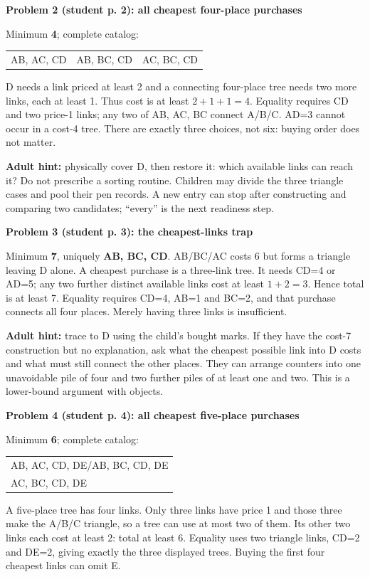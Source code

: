 \documentclass[11pt,letterpaper]{article}
\newcommand\task[2]{\par\vspace{3pt}\textbf{Problem #1 (student p. #1): #2}\par}
\begin{document}
\task{2}{all cheapest four-place purchases}
Minimum \textbf{4}; complete catalog:
\begin{center}
\begin{tabular}{lll}
AB, AC, CD & AB, BC, CD & AC, BC, CD
\end{tabular}
\end{center}
D needs a link priced at least 2 and a connecting four-place tree needs two more links, each at least 1. Thus cost is at least $2+1+1=4$. Equality requires CD and two price-1 links; any two of AB, AC, BC connect A/B/C. AD=3 cannot occur in a cost-4 tree. There are exactly three choices, not six: buying order does not matter.

\textbf{Adult hint:} physically cover D, then restore it: which available links can reach it? Do not prescribe a sorting routine. Children may divide the three triangle cases and pool their pen records. A new entry can stop after constructing and comparing two candidates; ``every'' is the next readiness step.

\task{3}{the cheapest-links trap}
Minimum \textbf{7}, uniquely \textbf{AB, BC, CD}. AB/BC/AC costs 6 but forms a triangle leaving D alone. A cheapest purchase is a three-link tree. It needs CD=4 or AD=5; any two further distinct available links cost at least $1+2=3$. Hence total is at least 7. Equality requires CD=4, AB=1 and BC=2, and that purchase connects all four places. Merely having three links is insufficient.

\textbf{Adult hint:} trace to D using the child's bought marks. If they have the cost-7 construction but no explanation, ask what the cheapest possible link into D costs and what must still connect the other places. They can arrange counters into one unavoidable pile of four and two further piles of at least one and two. This is a lower-bound argument with objects.

\task{4}{all cheapest five-place purchases}
Minimum \textbf{6}; complete catalog:
\begin{center}
\begin{tabular}{l}
AB, AC, CD, DE\quad /\quad AB, BC, CD, DE\\[2pt]
AC, BC, CD, DE
\end{tabular}
\end{center}
A five-place tree has four links. Only three links have price 1 and those three make the A/B/C triangle, so a tree can use at most two of them. Its other two links each cost at least 2: total at least 6. Equality uses two triangle links, CD=2 and DE=2, giving exactly the three displayed trees. Buying the first four cheapest links can omit E.
\end{document}
